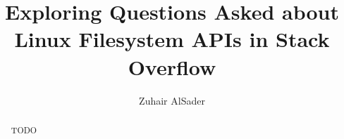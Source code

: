 \documentclass[sigconf]{acmart}
\begin{document}
\title{Exploring Questions Asked about Linux Filesystem APIs in Stack Overflow}

\author{Zuhair AlSader}

\begin{abstract}
TODO
\end{abstract}



\maketitle





\end{document}
